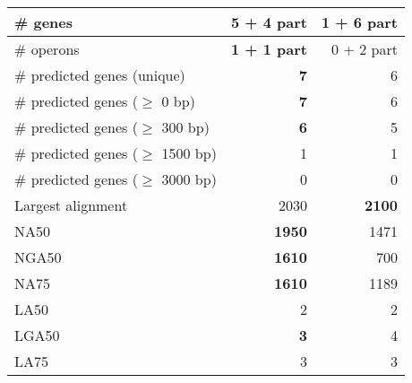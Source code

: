 \documentclass[12pt,a4paper]{article}
\begin{document}
\begin{table}[ht]
\begin{center}
\begin{tabular}{|l*{2}{|r}|}
\# genes & {\bf 5 + 4 part} & 1 + 6 part \\ \hline
\# operons & {\bf 1 + 1 part} & 0 + 2 part \\ \hline
\# predicted genes (unique) & {\bf 7} & 6 \\ \hline
\# predicted genes ($\geq$ 0 bp) & {\bf 7} & 6 \\ \hline
\# predicted genes ($\geq$ 300 bp) & {\bf 6} & 5 \\ \hline
\# predicted genes ($\geq$ 1500 bp) & 1 & 1 \\ \hline
\# predicted genes ($\geq$ 3000 bp) & 0 & 0 \\ \hline
Largest alignment & 2030 & {\bf 2100} \\ \hline
NA50 & {\bf 1950} & 1471 \\ \hline
NGA50 & {\bf 1610} & 700 \\ \hline
NA75 & {\bf 1610} & 1189 \\ \hline
LA50 & 2 & 2 \\ \hline
LGA50 & {\bf 3} & 4 \\ \hline
LA75 & 3 & 3 \\ \hline
\end{tabular}
\end{center}
\end{table}
\end{document}
